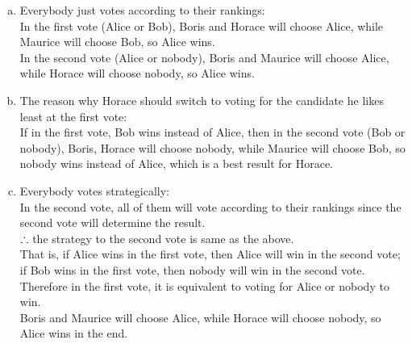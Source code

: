 \begin{pr}[2.12.26]$ $
\begin{enumerate}[(a)]
\item Everybody just votes according to their rankings:\\
In the first vote (Alice or Bob), Boris and Horace will choose Alice, while Maurice will choose Bob, so Alice wins.\\
In the second vote (Alice or nobody), Boris and Maurice will choose Alice, while Horace will choose nobody, so Alice wins.
\item The reason why Horace should switch to voting for the candidate he likes least at the first vote:\\
If in the first vote, Bob wins instead of Alice, then in the second vote (Bob or nobody), Boris, Horace will choose nobody, while Maurice will choose Bob, so nobody wins instead of Alice, which is a best result for Horace.
\item Everybody votes strategically:\\
In the second vote, all of them will vote according to their rankings since the second vote will determine the result.\\
$\therefore$ the strategy to the second vote is same as the above.\\
That is, if Alice wins in the first vote, then Alice will win in the second vote; if Bob wins in the first vote, then nobody will win in the second vote.\\
Therefore in the first vote, it is equivalent to voting for Alice or nobody to win.\\
Boris and Maurice will choose Alice, while Horace will choose nobody, so Alice wins in the end.
\end{enumerate}
\end{pr}
